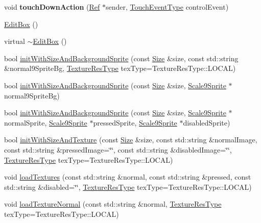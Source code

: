 \begin{DoxyCompactItemize}
void {\bfseries touch\+Down\+Action} (\hyperlink{classRef}{Ref} $\ast$sender, \hyperlink{classui_1_1Widget_a4829c0f1cbaf1fd820a9b2ccf0c58c73}{Touch\+Event\+Type} control\+Event)
\item 
\hyperlink{classui_1_1EditBox_a4a1a6eaee4479a9d7483de3f47c7d1f4}{Edit\+Box} ()
\item 
virtual \hyperlink{classui_1_1EditBox_a0ee2f35419817b117245eb6577f9f29e}{$\sim$\+Edit\+Box} ()
\item 
bool \hyperlink{classui_1_1EditBox_a451ac17204e52de6f3561dfa95110eef}{init\+With\+Size\+And\+Background\+Sprite} (const \hyperlink{classSize}{Size} \&size, const std\+::string \&normal9\+Sprite\+Bg, \hyperlink{classui_1_1Widget_a040a65ec5ad3b11119b7e16b98bd9af0}{Texture\+Res\+Type} tex\+Type=Texture\+Res\+Type\+::\+L\+O\+C\+AL)
\item 
bool \hyperlink{classui_1_1EditBox_a196793a6b697c3033aceee7ec7bd4846}{init\+With\+Size\+And\+Background\+Sprite} (const \hyperlink{classSize}{Size} \&size, \hyperlink{classui_1_1Scale9Sprite}{Scale9\+Sprite} $\ast$normal9\+Sprite\+Bg)
\item 
bool \hyperlink{classui_1_1EditBox_a200998adef67726af687f61da2a928f2}{init\+With\+Size\+And\+Background\+Sprite} (const \hyperlink{classSize}{Size} \&size, \hyperlink{classui_1_1Scale9Sprite}{Scale9\+Sprite} $\ast$normal\+Sprite, \hyperlink{classui_1_1Scale9Sprite}{Scale9\+Sprite} $\ast$pressed\+Sprite, \hyperlink{classui_1_1Scale9Sprite}{Scale9\+Sprite} $\ast$disabled\+Sprite)
\item 
bool \hyperlink{classui_1_1EditBox_ad90d3a68ba9918557cb9d329d19318d7}{init\+With\+Size\+And\+Texture} (const \hyperlink{classSize}{Size} \&size, const std\+::string \&normal\+Image, const std\+::string \&pressed\+Image=\char`\"{}\char`\"{}, const std\+::string \&disabled\+Image=\char`\"{}\char`\"{}, \hyperlink{classui_1_1Widget_a040a65ec5ad3b11119b7e16b98bd9af0}{Texture\+Res\+Type} tex\+Type=Texture\+Res\+Type\+::\+L\+O\+C\+AL)
\item 
void \hyperlink{classui_1_1EditBox_a8618a7f2a642e858e893657b16b89fa9}{load\+Textures} (const std\+::string \&normal, const std\+::string \&pressed, const std\+::string \&disabled=\char`\"{}\char`\"{}, \hyperlink{classui_1_1Widget_a040a65ec5ad3b11119b7e16b98bd9af0}{Texture\+Res\+Type} tex\+Type=Texture\+Res\+Type\+::\+L\+O\+C\+AL)
\item 
void \hyperlink{classui_1_1EditBox_a7edbd1ea73afccd9ef3797522e991211}{load\+Texture\+Normal} (const std\+::string \&normal, \hyperlink{classui_1_1Widget_a040a65ec5ad3b11119b7e16b98bd9af0}{Texture\+Res\+Type} tex\+Type=Texture\+Res\+Type\+::\+L\+O\+C\+AL)

\end{DoxyCompactItemize}
